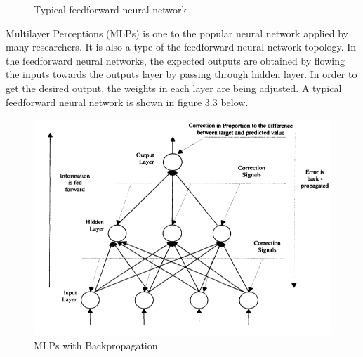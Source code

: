 \begin{figure}[hbt!]\centering
	\caption{Typical feedforward neural network}
\end{figure}

Multilayer Perceptions (MLPs) is one to the popular neural network applied by many researchers\cite{pacelli:2011}. It is also a type of the feedforward neural network topology. In the feedforward neural networks, the expected outputs are obtained by flowing the inputs  towards the outputs layer by passing through hidden layer. In order to get the desired output, the weights in each layer are being adjusted. A typical feedforward neural network is shown in  figure 3.3 below. 

\begin{figure}[hbt!]\centering
	\includegraphics[width=.6\textwidth]{mlpwithBP}
	\caption{MLPs with Backpropagation}
\end{figure}

